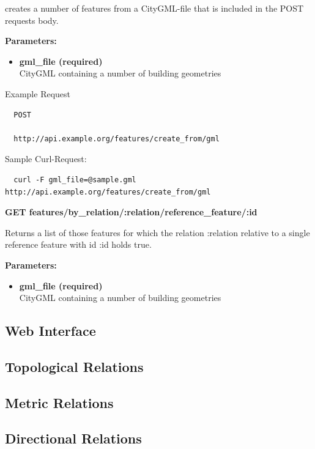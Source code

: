 \documentclass[paper=a4, fontsize=11pt]{scrartcl} %
\numberwithin{equation}{section} %
\numberwithin{figure}{section} %
\numberwithin{table}{section} %
\begin{document}
creates a number of features from a CityGML-file that is included in the POST requests body. 

\textbf{Parameters:}
\begin{itemize}
\item \textrm{\textbf{gml\_file (required)}}\\
  CityGML containing a number of building geometries
\end{itemize}

Example Request
\begin{verbatim}
  POST

  http://api.example.org/features/create_from/gml
\end{verbatim}

Sample Curl-Request:
\begin{verbatim}
  curl -F gml_file=@sample.gml http://api.example.org/features/create_from/gml
\end{verbatim}

\vspace{1em} \large{\textbf{GET features/by\_relation/:relation/reference\_feature/:id}}  \normalsize 

Returns a list of those features for which the relation \textrm{:relation} relative to a single reference feature with id \textrm{:id} holds true. 

\textbf{Parameters:}
\begin{itemize}
\item \textrm{\textbf{gml\_file (required)}}\\
  CityGML containing a number of building geometries
\end{itemize}




\subsection{Web Interface}\label{sec:web-interface}

\subsection{Topological Relations}\label{sec:topol-relat}
\subsection{Metric Relations}\label{sec:metric-relations}
\subsection{Directional Relations}\label{sec:direct-relat}
\end{document}
